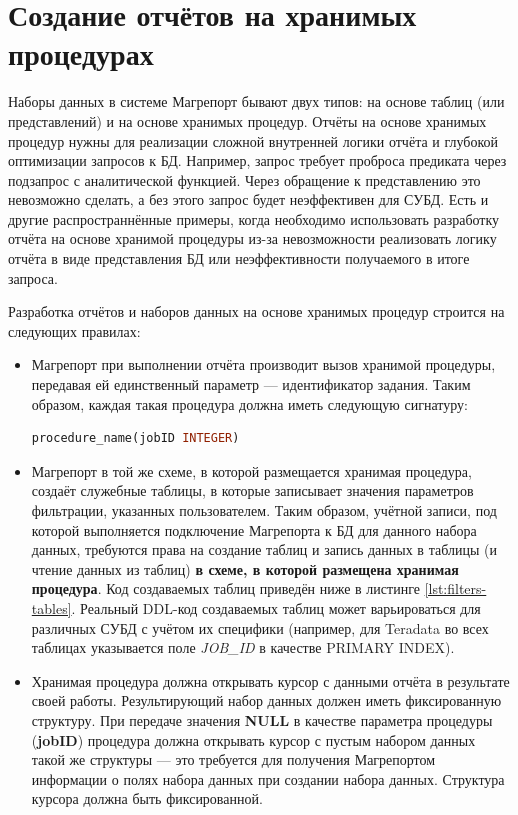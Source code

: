 \documentclass[../user-manual.tex]{subfiles}
\begin{document}
	\section{Создание отчётов на хранимых процедурах}\label{developing:stored-procedure-reports}
	
	Наборы данных в системе Магрепорт бывают двух типов: на основе таблиц (или представлений) и на основе хранимых процедур. Отчёты на основе хранимых процедур нужны для реализации сложной внутренней логики отчёта и глубокой оптимизации запросов к БД. Например, запрос требует проброса предиката через подзапрос с аналитической функцией. Через обращение к представлению это невозможно сделать, а без этого запрос будет неэффективен для СУБД. Есть и другие распространнённые примеры, когда необходимо использовать разработку отчёта на основе хранимой процедуры из-за невозможности реализовать логику отчёта в виде представления БД или неэффективности получаемого в итоге запроса.
	
	Разработка отчётов и наборов данных на основе хранимых процедур строится на следующих правилах:
	
	\begin{itemize}
		\item Магрепорт при выполнении отчёта производит вызов хранимой процедуры, передавая ей единственный параметр --- идентификатор задания. Таким образом, каждая такая процедура должна иметь следующую сигнатуру:
		
\begin{lstlisting}[language=SQL]
procedure_name(jobID INTEGER)
\end{lstlisting}
	
	\item Магрепорт в той же схеме, в которой размещается хранимая процедура, создаёт служебные таблицы, в которые записывает значения параметров фильтрации, указанных пользователем. Таким образом, учётной записи, под которой выполняется подключение Магрепорта к БД для данного набора данных, требуются права на создание таблиц и запись данных в таблицы (и чтение данных из таблиц) \textbf{в схеме, в которой размещена хранимая процедура}. Код создаваемых таблиц приведён ниже в листинге \ref{lst:filters-tables}. Реальный DDL-код создаваемых таблиц может варьироваться для различных СУБД с учётом их специфики (например, для Teradata во всех таблицах указывается поле \textit{JOB\_ID} в качестве PRIMARY INDEX).
	
	\item Хранимая процедура должна открывать курсор с данными отчёта в результате своей работы. Результирующий набор данных должен иметь фиксированную структуру. При передаче значения \textbf{NULL} в качестве параметра процедуры (\textbf{jobID}) процедура должна открывать курсор с пустым набором данных такой же структуры --- это требуется для получения Магрепортом информации о полях набора данных при создании набора данных. Структура курсора должна быть фиксированной.
		
	\end{itemize}
	
\end{document}
